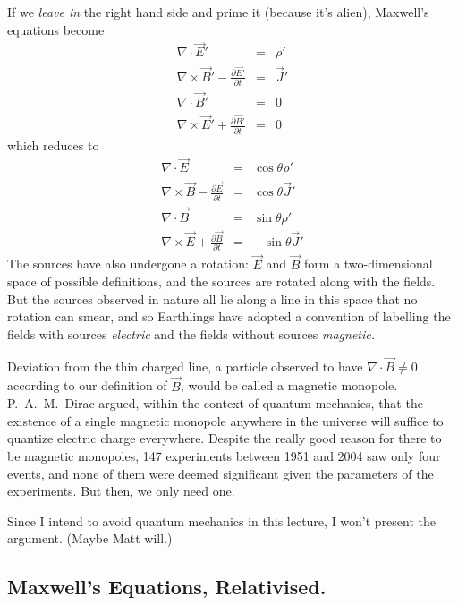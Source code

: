 \documentclass[12pt]{article}
\begin{document}
If we {\it leave in} the right hand side and prime it (because it's
alien), Maxwell's equations become
\begin{eqnarray}
  \nabla \cdot \vec{E}' &=& \displaystyle \rho' \\
  \displaystyle \nabla \times \vec{B}' - \frac{\partial \vec{E}'}{\partial t} &=& \vec{J}' \\
  \nabla \cdot \vec{B}' &=& 0 \\
  \displaystyle \nabla \times \vec{E}' + \frac{\partial \vec{B}'}{\partial t} &=& 0
\end{eqnarray}
which reduces to
\begin{eqnarray}
  \nabla \cdot \vec{E} &=& \displaystyle \cos\theta \rho' \\
  \displaystyle \nabla \times \vec{B} - \frac{\partial \vec{E}}{\partial t} &=& \cos\theta \vec{J}' \\
  \nabla \cdot \vec{B} &=& \sin\theta \rho' \\
  \displaystyle \nabla \times \vec{E} + \frac{\partial \vec{B}}{\partial t} &=& -\sin\theta \vec{J}'
\end{eqnarray}
The sources have also undergone a rotation: $\vec{E}$ and $\vec{B}$
form a two-dimensional space of possible definitions, and the sources
are rotated along with the fields.  But the sources observed in nature
all lie along a line in this space that no rotation can smear, and so
Earthlings have adopted a convention of labelling the fields with
sources {\it electric} and the fields without sources {\it magnetic.}

Deviation from the thin charged line, a particle observed to have
$\nabla \cdot \vec{B} \ne 0$ according to our definition of $\vec{B}$,
would be called a magnetic monopole.  P.\ A.\ M.\ Dirac argued, within
the context of quantum mechanics, that the existence of a single
magnetic monopole anywhere in the universe will suffice to quantize
electric charge everywhere.  Despite the really good reason for there
to be magnetic monopoles, 147 experiments between 1951 and 2004 saw
only four events, and none of them were deemed significant given the
parameters of the experiments.  But then, we only need one.

Since I intend to avoid quantum mechanics in this lecture, I won't
present the argument.  (Maybe Matt will.)

\subsection{Maxwell's Equations, Relativised.}
\end{document}
